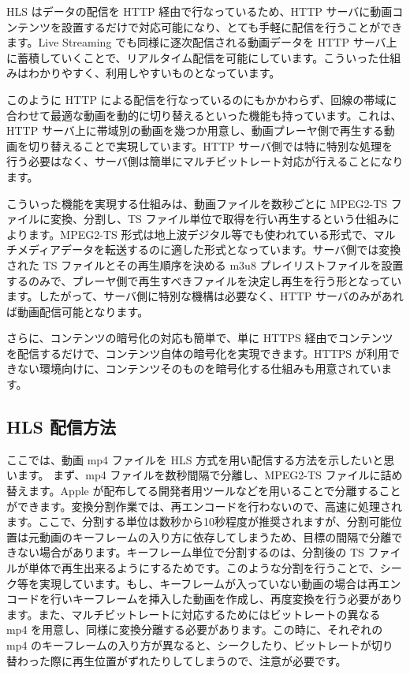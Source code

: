  HLS はデータの配信を HTTP 経由で行なっているため、HTTP サーバに動画コンテンツを設置するだけで対応可能になり、とても手軽に配信を行うことができます。Live Streaming でも同様に逐次配信される動画データを HTTP サーバ上に蓄積していくことで、リアルタイム配信を可能にしています。こういった仕組みはわかりやすく、利用しやすいものとなっています。

 このように HTTP による配信を行なっているのにもかかわらず、回線の帯域に合わせて最適な動画を動的に切り替えるといった機能も持っています。これは、HTTP サーバ上に帯域別の動画を幾つか用意し、動画プレーヤ側で再生する動画を切り替えることで実現しています。HTTP サーバ側では特に特別な処理を行う必要はなく、サーバ側は簡単にマルチビットレート対応が行えることになります。

 こういった機能を実現する仕組みは、動画ファイルを数秒ごとに MPEG2-TS ファイルに変換、分割し、TS ファイル単位で取得を行い再生するという仕組みによります。MPEG2-TS 形式は地上波デジタル等でも使われている形式で、マルチメディアデータを転送するのに適した形式となっています。サーバ側では変換された TS ファイルとその再生順序を決める m3u8 プレイリストファイルを設置するのみで、プレーヤ側で再生すべきファイルを決定し再生を行う形となっています。したがって、サーバ側に特別な機構は必要なく、HTTP サーバのみがあれば動画配信可能となります。

 さらに、コンテンツの暗号化の対応も簡単で、単に HTTPS 経由でコンテンツを配信するだけで、コンテンツ自体の暗号化を実現できます。HTTPS が利用できない環境向けに、コンテンツそのものを暗号化する仕組みも用意されています。

\subsection{HLS 配信方法}
 ここでは、動画 mp4 ファイルを HLS 方式を用い配信する方法を示したいと思います。
 まず、mp4 ファイルを数秒間隔で分離し、MPEG2-TS ファイルに詰め替えます。Apple が配布してる開発者用ツールなどを用いることで分離することができます。変換分割作業では、再エンコードを行わないので、高速に処理されます。ここで、分割する単位は数秒から10秒程度が推奨されますが、分割可能位置は元動画のキーフレームの入り方に依存してしまうため、目標の間隔で分離できない場合があります。キーフレーム単位で分割するのは、分割後の TS ファイルが単体で再生出来るようにするためです。このような分割を行うことで、シーク等を実現しています。もし、キーフレームが入っていない動画の場合は再エンコードを行いキーフレームを挿入した動画を作成し、再度変換を行う必要があります。また、マルチビットレートに対応するためにはビットレートの異なる mp4 を用意し、同様に変換分離する必要があります。この時に、それぞれの mp4 のキーフレームの入り方が異なると、シークしたり、ビットレートが切り替わった際に再生位置がずれたりしてしまうので、注意が必要です。

